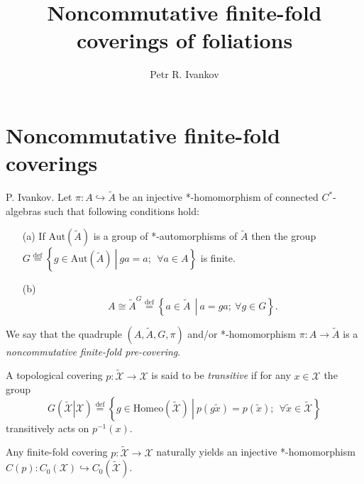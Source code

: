 \documentclass{beamer}
\title{Noncommutative finite-fold coverings of foliations}
\institute
{
Noncommutative geometry and topology
}
\author{Petr R. Ivankov  }
\theoremstyle{plain}
\newcommand{\be}{\begin{equation}}
\newcommand{\ee}{\end{equation}}
\newcommand{\Aut}{\mathrm{Aut}}
\newcommand{\sX}{\mathcal{X}}       %
\newcommand{\bydef}{\stackrel{\mathrm{def}}{=}}
\newcommand{\hookto}{\hookrightarrow}        %
\begin{document}
\begin{frame}
  \titlepage
\end{frame}
	\section{Noncommutative finite-fold coverings}
\begin{frame}
	   \begin{definition}\label{pre_defn} \alert{P. Ivankov}.
		Let $\pi: A \hookto \widetilde{A}$ be an injective *-homomorphism of connected  $C^*$-algebras such that following conditions hold:
		\begin{enumerate}
			\item[(a)] If $\Aut\left(\widetilde{A} \right)$ is a group of *-automorphisms of $\widetilde{A}$ then the group  
			$
			G \bydef \left\{ \left.g \in \Aut\left(\widetilde{A} \right)~\right|~ ga = a;~~\forall a \in A\right\}
			$
			is finite.
			\item[(b)] 	\be\label{cond_b_eqn}
			A \cong \widetilde{A}^G\stackrel{\text{def}}{=}\left\{\left.a\in \widetilde{A}~~\right|~ a = g a;~ \forall g \in G\right\}.\ee
		\end{enumerate}
		We say that the quadruple $\left(A, \widetilde{A}, G, \pi \right)$ and/or *-homomorphism $\pi: A \to \widetilde{A}$   is a \textit{noncommutative finite-fold  pre-covering}. 
	\end{definition}

\end{frame}

\begin{frame}


\begin{definition}
	A topological covering $ p:\widetilde{\mathcal  X}\to \mathcal  X$ is said to be \textit{transitive} if for any $x \in \mathcal  X$ the group
	$$
	G\left(\left.\widetilde{\mathcal  X} \right|\mathcal  X\right)\bydef \left\{ \left.g \in \text{Homeo}\left(\widetilde{\mathcal X} \right)~\right|~ p(g\widetilde{x}) = p(\widetilde{x});~~\forall \widetilde{x} \in \widetilde{\mathcal  X}\right\} 
	$$
	transitively acts on $p^{-1}\left(x\right)$.
\end{definition}
\begin{fact}
	Any finite-fold covering   $ p:\widetilde{\mathcal  X}\to \mathcal  X$ naturally yields an injective *-homomorphism $C\left( p\right) : C_0\left(\sX \right) \hookto C_0\left( \widetilde{\mathcal  X}\right)$.
\end{fact}

\end{frame}
\end{document}
